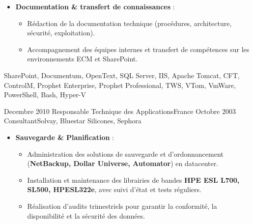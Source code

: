 \begin{experiences}
{\begin{itemize}[left=0pt,label={},itemsep=0.4em]
\begin{itemize}[itemsep=0.15em,topsep=0.1em,parsep=0pt]
              \item Coordination d’équipes offshore (Pologne, Maroc, Inde) pour le maintien en condition opérationnelle.
            \end{itemize}
          \vspace{0.1em}
          \item \textbf{Documentation \& transfert de connaissances} :
            \begin{itemize}[itemsep=0.15em,topsep=0.1em,parsep=0pt]
              \small
              \item Rédaction de la documentation technique (procédures, architecture, sécurité, exploitation).
              \item Accompagnement des équipes internes et transfert de compétences sur les environnements ECM et SharePoint.
            \end{itemize}
        \end{itemize}
        \vspace{0.3em}
    }
    {SharePoint, Documentum, OpenText, SQL Server, IIS, Apache Tomcat, CFT, ControlM, Prophet Enterprise, Prophet Professional, TWS, VTom, VmWare, PowerShell, Bash, Hyper-V}
\emptySeparator


\consultantexperience
    {Decembre 2010} {Responsable Technique des Applications}{}{France}
    {Octobre 2003}    {Consultant}{Solvay, Bluestar Silicones, Sephora} {
        \begin{itemize}[left=0pt,label={},itemsep=0.5em]
        \vspace{0.3em}  %
          \item \textbf{Sauvegarde \& Planification} :
            \begin{itemize}[itemsep=0.2em,topsep=0.2em,parsep=0pt]
              \small
              \item Administration des solutions de sauvegarde et d’ordonnancement (\textbf{NetBackup, Dollar Universe, Automator}) en datacenter.
              \item Installation et maintenance des librairies de bandes \textbf{HPE ESL L700, SL500, HPESL322e}, avec suivi d’état et tests réguliers.
              \item Réalisation d’audits trimestriels pour garantir la conformité, la disponibilité et la sécurité des données.
            \end{itemize}

          \vspace{0.3em}


\end{itemize}}
\end{experiences}
